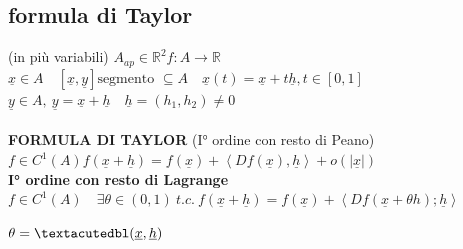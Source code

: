 \documentclass[a4paper, oneside]{article}
\begin{document}
        \subsection{formula di Taylor}(in più variabili)
        $A_{ap} \in \mathbb{R}^2 f:A\to \mathbb{R}$\\
        $\underline{x} \in A \quad [\underline{x}, \underline{y}] \text{segmento } \subseteq A \quad \underline{x}(t) = \underline{x} + t \underline{h} , t \in [0,1]$\\
        $ \underline{y} \in A, \ \underline{y} = \underline{x} + \underline{h} \quad \underline{h} = (h_1,h_2) \neq 0$\\\\
        \textbf{FORMULA DI TAYLOR} (I° ordine con resto di Peano)\\
        $f \in C^1(A) f(\underline{x}+\underline{h}) = f(\underline{x}) + \left\langle Df(\underline{x}), \underline{h}\right\rangle  + o(|\underline{x}|)  $\\
        \textbf{I° ordine con resto di Lagrange}\\
        $f \in C^1(A) \quad \exists\theta \in (0,1) \ t.c. \ f(\underline{x} + \underline{h}) = f(\underline{x}) + \left\langle Df(\underline{x} + \theta h); \underline{h}\right\rangle $\\
        \begin{observation}
            $\theta = \textacutedbl(\underline{x}, \underline{h})$\\
        \end{observation}
\end{document}
